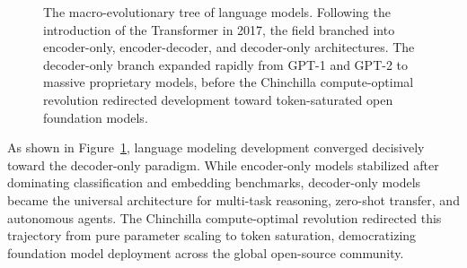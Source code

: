 \documentclass[../../../main.tex]{subfiles}
\begin{document}
\begin{figure}[t]
\caption{The macro-evolutionary tree of language models. Following the introduction of the Transformer in 2017, the field branched into encoder-only, encoder-decoder, and decoder-only architectures. The decoder-only branch expanded rapidly from GPT-1 and GPT-2 to massive proprietary models, before the Chinchilla compute-optimal revolution redirected development toward token-saturated open foundation models.}
\label{fig:evolutionary_tree}
\end{figure}

As shown in Figure~\ref{fig:evolutionary_tree}, language modeling development converged decisively toward the decoder-only paradigm. While encoder-only models stabilized after dominating classification and embedding benchmarks, decoder-only models became the universal architecture for multi-task reasoning, zero-shot transfer, and autonomous agents. The Chinchilla compute-optimal revolution redirected this trajectory from pure parameter scaling to token saturation, democratizing foundation model deployment across the global open-source community.
\end{document}
